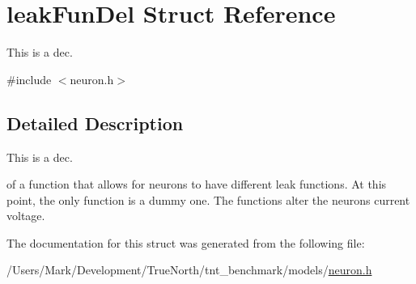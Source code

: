 \hypertarget{structleak_fun_del}{}\section{leak\+Fun\+Del Struct Reference}
\label{structleak_fun_del}


This is a dec.  




{\ttfamily \#include $<$neuron.\+h$>$}



\subsection{Detailed Description}
This is a dec. 

of a function that allows for neurons to have different leak functions. At this point, the only function is a dummy one. The functions alter the neuron\textquotesingle{}s current voltage. 

The documentation for this struct was generated from the following file\+:\begin{DoxyCompactItemize}
\item 
/\+Users/\+Mark/\+Development/\+True\+North/tnt\+\_\+benchmark/models/\hyperlink{neuron_8h}{neuron.\+h}\end{DoxyCompactItemize}
